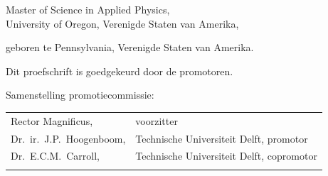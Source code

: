 \begin{titlepage}
\begin{center}
\bigskip
\bigskip

Master of Science in Applied Physics, \\
University of Oregon, Verenigde Staten van Amerika,

geboren te Pennsylvania, Verenigde Staten van Amerika.

\vspace*{2\bigskipamount}

\end{center}

\clearpage
\thispagestyle{empty}

\noindent Dit proefschrift is goedgekeurd door de promotoren.


\bigskip
\noindent Samenstelling promotiecommissie:

\medskip\noindent
\begin{tabular}{p{4cm}l}
    Rector Magnificus, & voorzitter \\
    Dr.\ ir.\ J.P.\ Hoogenboom, & Technische Universiteit Delft, promotor \\
    Dr.\ E.C.M.\ Carroll, & Technische Universiteit Delft, copromotor \\

    \medskip



\end{tabular}
\end{titlepage}
